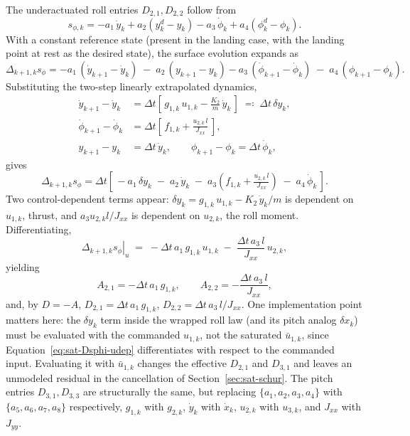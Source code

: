 \documentclass[conf]{new-aiaa}
\begin{document}
The underactuated roll entries $D_{2,1}, D_{2,2}$ follow from
\small
\begin{equation}
\label{eq:sat-sphi}
s_{\phi,k} = -a_1\,\dot y_k + a_2(y_k^d - y_k) - a_3\,\dot\phi_k + a_4(\phi_k^d - \phi_k).
\end{equation}
\normalsize
With a constant reference state (present in the landing case, with the landing point at rest as the desired state), the surface evolution expands as
\small
\begin{equation}
\Delta_{k+1,k} s_\phi
= -a_1\,(\dot y_{k+1} - \dot y_k) \;-\; a_2\,(y_{k+1} - y_k)
- a_3\,(\dot\phi_{k+1} - \dot\phi_k) \;-\; a_4\,(\phi_{k+1} - \phi_k).
\end{equation}
\normalsize
Substituting the two-step linearly extrapolated dynamics,
\small
\begin{align}
\dot y_{k+1} - \dot y_k
&= \Delta t\!\left[\, g_{1,k}\, u_{1,k} - \tfrac{K_2}{m}\,\dot y_k \,\right] \;\eqqcolon\; \Delta t\, \delta y_k, \\
\dot\phi_{k+1} - \dot\phi_k
&= \Delta t\!\left[\, f_{1,k} + \tfrac{u_{2,k}\, l}{J_{xx}} \,\right], \\
y_{k+1} - y_k &= \Delta t\, \dot y_k,
\qquad
\phi_{k+1} - \phi_k = \Delta t\, \dot\phi_k,
\end{align}
\normalsize
gives
\small
\begin{equation}
\label{eq:sat-Dsphi}
\Delta_{k+1,k} s_\phi = \Delta t \!\left[\,
-a_1\,\delta y_k \;-\; a_2\,\dot y_k \;-\; a_3\!\left( f_{1,k} + \tfrac{u_{2,k}\, l}{J_{xx}} \right) \;-\; a_4\,\dot\phi_k
\,\right].
\end{equation}
\normalsize
Two control-dependent terms appear: $\delta y_k = g_{1,k}\, u_{1,k} - K_2\,\dot y_k/m$ is dependent on $u_{1,k}$, thrust, and $a_3 u_{2,k} l/J_{xx}$ is dependent on $u_{2,k}$, the roll moment. Differentiating,
\small
\begin{equation}
\label{eq:sat-Dsphi-udep}
\left.\Delta_{k+1,k} s_\phi\right|_u
\;=\; -\Delta t\, a_1\, g_{1,k}\, u_{1,k}
\;-\;
\frac{\Delta t\, a_3\, l}{J_{xx}}\, u_{2,k},
\end{equation}
\normalsize
yielding
\begin{equation}
\label{eq:sat-A-roll}
A_{2,1} = -\Delta t\, a_1\, g_{1,k},
\qquad
A_{2,2} = -\frac{\Delta t\, a_3\, l}{J_{xx}},
\end{equation}
and, by $D = -A$, $D_{2,1} = \Delta t\, a_1\, g_{1,k}$, $D_{2,2} = \Delta t\, a_3\, l/J_{xx}$. One implementation point matters here: the $\delta y_k$ term inside the wrapped roll law (and its pitch analog $\delta x_k$) must be evaluated with the commanded $u_{1,k}$, not the saturated $\bar u_{1,k}$, since Equation~\ref{eq:sat-Dsphi-udep} differentiates with respect to the commanded input. Evaluating it with $\bar u_{1,k}$ changes the effective $D_{2,1}$ and $D_{3,1}$ and leaves an unmodeled residual in the cancellation of Section~\ref{sec:sat-schur}. The pitch entries $D_{3,1}, D_{3,3}$ are structurally the same, but replacing $\{a_1, a_2, a_3, a_4\}$ with $\{a_5, a_6, a_7, a_8\}$ respectively, $g_{1,k}$ with $g_{2,k}$, $\dot y_k$ with $\dot x_k$, $u_{2,k}$ with $u_{3,k}$, and $J_{xx}$ with $J_{yy}$.
\end{document}
